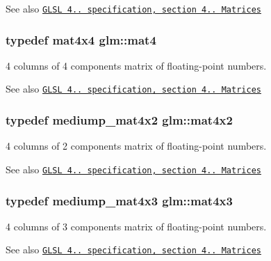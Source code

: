 \begin{DoxySeeAlso}{See also}
\href{http://www.opengl.org/registry/doc/GLSLangSpec.4.20.8.pdf}{\tt G\+L\+S\+L 4.. specification, section 4.. Matrices} 
\end{DoxySeeAlso}
\hypertarget{group__core__types_ga7dcd2365c2e368e6af5b7adeb6a9c8df}{}
\subsubsection[{mat4}]{\setlength{\rightskip}{0pt plus 5cm}typedef mat4x4 {\bf glm\+::mat4}}\label{group__core__types_ga7dcd2365c2e368e6af5b7adeb6a9c8df}
4 columns of 4 components matrix of floating-\/point numbers.

\begin{DoxySeeAlso}{See also}
\href{http://www.opengl.org/registry/doc/GLSLangSpec.4.20.8.pdf}{\tt G\+L\+S\+L 4.. specification, section 4.. Matrices} 
\end{DoxySeeAlso}
\hypertarget{group__core__types_gaf8b375fbef797b3730fcddc7bd60b59f}{}
\subsubsection[{mat4x2}]{\setlength{\rightskip}{0pt plus 5cm}typedef mediump\+\_\+mat4x2 {\bf glm\+::mat4x2}}\label{group__core__types_gaf8b375fbef797b3730fcddc7bd60b59f}
4 columns of 2 components matrix of floating-\/point numbers.

\begin{DoxySeeAlso}{See also}
\href{http://www.opengl.org/registry/doc/GLSLangSpec.4.20.8.pdf}{\tt G\+L\+S\+L 4.. specification, section 4.. Matrices} 
\end{DoxySeeAlso}
\hypertarget{group__core__types_ga605b649496ad53379e8ac6d7a4534667}{}
\subsubsection[{mat4x3}]{\setlength{\rightskip}{0pt plus 5cm}typedef mediump\+\_\+mat4x3 {\bf glm\+::mat4x3}}\label{group__core__types_ga605b649496ad53379e8ac6d7a4534667}
4 columns of 3 components matrix of floating-\/point numbers.

\begin{DoxySeeAlso}{See also}
\href{http://www.opengl.org/registry/doc/GLSLangSpec.4.20.8.pdf}{\tt G\+L\+S\+L 4.. specification, section 4.. Matrices} 
\end{DoxySeeAlso}
\hypertarget{group__core__types_gafe3341c717b9f9725019a10fd1dcf9c1}{}
